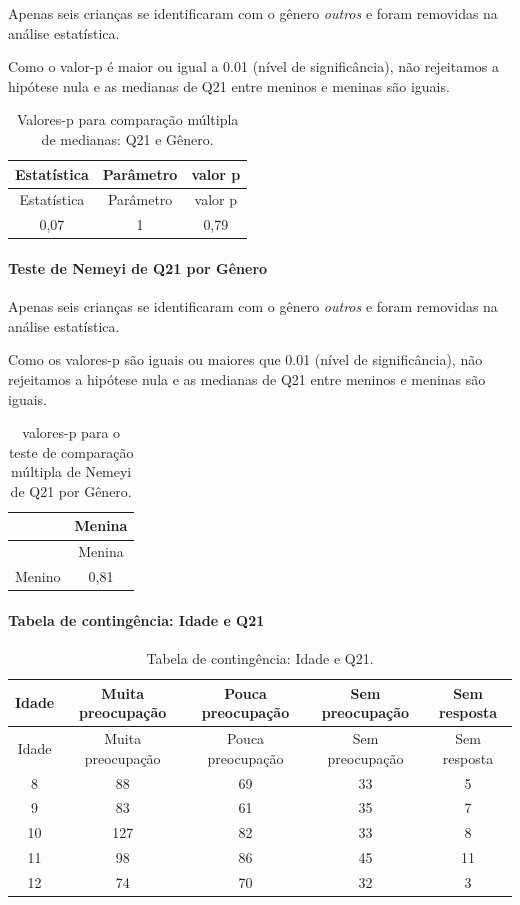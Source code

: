\documentclass[]{article}
\let\oldparagraph\paragraph
\renewcommand{\paragraph}[1]{\oldparagraph{#1}\mbox{}}
\begin{document}
Apenas seis crianças se identificaram com o gênero \emph{outros} e foram removidas na análise estatística.

Como o valor-p é maior ou igual a 0.01 (nível de significância), não rejeitamos a hipótese nula e as medianas de Q21 entre meninos e meninas são iguais.

\begin{longtable}[]{@{}ccc@{}}
\caption{\label{tab:unnamed-chunk-443}Valores-p para comparação múltipla de medianas: Q21 e Gênero.}\tabularnewline
\toprule
Estatística & Parâmetro & valor p\tabularnewline
\midrule
\endfirsthead
\toprule
Estatística & Parâmetro & valor p\tabularnewline
\midrule
\endhead
0,07 & 1 & 0,79\tabularnewline
\bottomrule
\end{longtable}

\hypertarget{teste-de-nemeyi-de-q21-por-guxeanero}{%
\paragraph{Teste de Nemeyi de Q21 por Gênero}\label{teste-de-nemeyi-de-q21-por-guxeanero}}

Apenas seis crianças se identificaram com o gênero \emph{outros} e foram removidas na análise estatística.

Como os valores-p são iguais ou maiores que 0.01 (nível de significância), não rejeitamos a hipótese nula e as medianas de Q21 entre meninos e meninas são iguais.

\begin{longtable}[]{@{}lc@{}}
\caption{\label{tab:unnamed-chunk-445}valores-p para o teste de comparação múltipla de Nemeyi de Q21 por Gênero.}\tabularnewline
\toprule
& Menina\tabularnewline
\midrule
\endfirsthead
\toprule
& Menina\tabularnewline
\midrule
\endhead
Menino & 0,81\tabularnewline
\bottomrule
\end{longtable}

\cleardoublepage

\hypertarget{tabela-de-continguxeancia-idade-e-q21}{%
\paragraph{Tabela de contingência: Idade e Q21}\label{tabela-de-continguxeancia-idade-e-q21}}

\begin{longtable}[]{@{}ccccc@{}}
\caption{\label{tab:unnamed-chunk-446}Tabela de contingência: Idade e Q21.}\tabularnewline
\toprule
Idade & Muita preocupação & Pouca preocupação & Sem preocupação & Sem resposta\tabularnewline
\midrule
\endfirsthead
\toprule
Idade & Muita preocupação & Pouca preocupação & Sem preocupação & Sem resposta\tabularnewline
\midrule
\endhead
8 & 88 & 69 & 33 & 5\tabularnewline
9 & 83 & 61 & 35 & 7\tabularnewline
10 & 127 & 82 & 33 & 8\tabularnewline
11 & 98 & 86 & 45 & 11\tabularnewline
12 & 74 & 70 & 32 & 3\tabularnewline
\bottomrule
\end{longtable}
\end{document}
